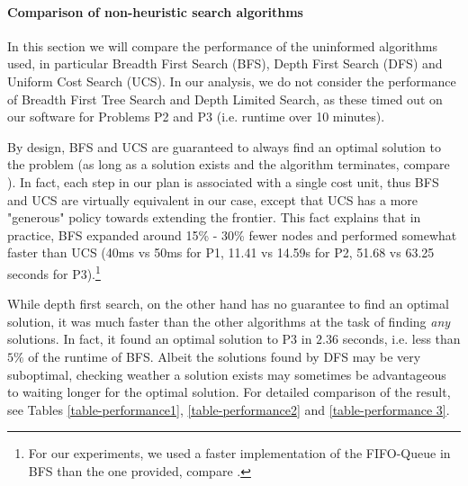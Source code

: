 \documentclass{article}
\theoremstyle{plain}
\theoremstyle{definition}
\theoremstyle{remark}
\begin{document}
\paragraph{Comparison of non-heuristic search algorithms}

In this section we will compare the performance of the uninformed algorithms used, in particular Breadth First Search (BFS), Depth First Search (DFS) and Uniform Cost Search (UCS). In our analysis, we do not consider the performance of Breadth First Tree Search and Depth Limited Search, as these timed out on our software for Problems P2 and P3 (i.e. runtime over 10 minutes).

By design, BFS and UCS are guaranteed to always find an optimal solution to the problem (as long as a solution exists and the algorithm terminates, compare \citet[Ch. 3.4]{russell2009artificial}). In fact, each step in our plan is associated with a single cost unit, thus BFS and UCS are virtually equivalent in our case, except that UCS has a more "generous" policy towards extending the frontier. This fact explains that in practice, BFS expanded around 15\% - 30\% fewer nodes and performed somewhat faster than UCS (40ms vs 50ms for P1, 11.41 vs 14.59s for P2, 51.68 vs 63.25 seconds for P3).\footnote{For our experiments, we used a faster implementation of the FIFO-Queue in BFS than the one provided, compare \cite{fifoForumPost}.}

While depth first search, on the other hand has no guarantee to find an optimal solution, it was much faster than the other algorithms at the task of finding \emph{any} solutions. In fact, it found an optimal solution to P3 in $2.36$ seconds, i.e. less than $5\%$ of the runtime of BFS. Albeit the solutions found by DFS may be very suboptimal, checking weather a solution exists may sometimes be advantageous to waiting longer for the optimal solution. For detailed comparison of the result, see Tables \ref{table-performance1}, \ref{table-performance2} and \ref{table-performance 3}. 
\end{document}
